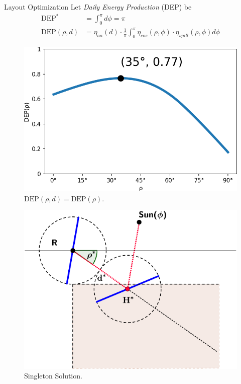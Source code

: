 \documentclass[10pt, xcolor={dvipsnames}]{beamer}
\begin{document}
\begin{frame}{Layout Optimization}
Let {\it Daily Energy Production} (DEP) be 
\begin{align}
\text{DEP}^{*} &= \int_{0}^{\pi} d\phi = \pi \\[.5em]
\text{DEP}(\rho, d) &= \eta_{aa}(d) \cdot 
\frac{1}{\pi}\int_{0}^{\pi} 
\eta_{cos}(\rho, \phi) \cdot \eta_{spill}(\rho, \phi)
d\phi
\end{align}
\begin{minipage}[t]{0.5\textwidth}
\begin{center}
\vspace{1.2cm}
\begin{figure}
\includegraphics[width=.8\textwidth]{../figures/DEP-crop.png}
\caption{$\text{DEP}(\rho, d) = \text{DEP}(\rho)$.}
\end{figure}
\end{center}
\end{minipage}%
\begin{minipage}[t]{0.5\textwidth}
\begin{center}
\begin{figure}
\includegraphics[width=\textwidth]{../figures/singleton-solution-crop.pdf}
\caption{Singleton Solution.}
\end{figure}
\end{center}
\end{minipage}
\end{frame}
\end{document}
